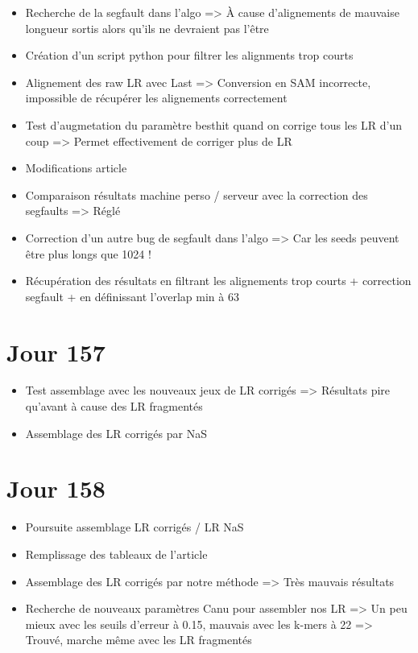 \documentclass[12pt]{report}
\begin{document}
\begin{itemize}
	\item Recherche de la segfault dans l'algo => À cause d'alignements de mauvaise longueur sortis alors qu'ils ne devraient pas l'être
	
	\item Création d'un script python pour filtrer les alignments trop courts
	
	\item Alignement des raw LR avec Last => Conversion en SAM incorrecte, impossible de récupérer les alignements correctement
	
	\item Test d'augmetation du paramètre besthit quand on corrige tous les LR d'un coup => Permet effectivement de corriger plus de LR
	
	\item Modifications article
	
	\item Comparaison résultats machine perso / serveur avec la correction des segfaults => Réglé
	
	\item Correction d'un autre bug de segfault dans l'algo => Car les seeds peuvent être plus longs que 1024 !
	
	\item Récupération des résultats en filtrant les alignements trop courts + correction segfault + en définissant l'overlap min à 63
\end{itemize}

\section{Jour 157}

\begin{itemize}
	\item Test assemblage avec les nouveaux jeux de LR corrigés => Résultats pire qu'avant à cause des LR fragmentés

	\item Assemblage des LR corrigés par NaS
\end{itemize}

\section{Jour 158}

\begin{itemize}
	\item Poursuite assemblage LR corrigés / LR NaS
	
	\item Remplissage des tableaux de l'article
	
	\item Assemblage des LR corrigés par notre méthode => Très mauvais résultats
	
	\item Recherche de nouveaux paramètres Canu pour assembler nos LR => Un peu mieux avec les seuils d'erreur à 0.15, mauvais avec les k-mers à 22
		  => Trouvé, marche même avec les LR fragmentés
\end{itemize}
\end{document}

